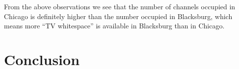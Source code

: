 \documentclass[12pt,sts]{report}
\begin{document}
	From the above observations we see that the number of channels occupied in Chicago is definitely higher than the number occupied in Blacksburg, which means more ``TV whitespace'' is available in Blacksburg than in Chicago.
	
	

	
	

\section{Conclusion}
\end{document}
